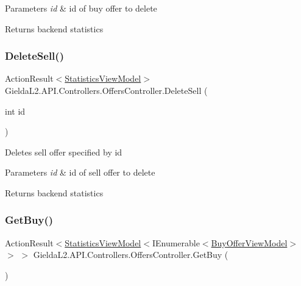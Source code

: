 \begin{DoxyParams}{Parameters}
{\em id} & id of buy offer to delete\\
\hline
\end{DoxyParams}
\begin{DoxyReturn}{Returns}
backend statistics
\end{DoxyReturn}
\mbox{\label{class_gielda_l2_1_1_a_p_i_1_1_controllers_1_1_offers_controller_a8290b7e739c2756489ff7d00b160fb82}} 
\subsubsection{\texorpdfstring{DeleteSell()}{DeleteSell()}}
{\footnotesize\ttfamily Action\+Result$<$\mbox{\hyperlink{class_gielda_l2_1_1_a_p_i_1_1_view_models_1_1_view_1_1_statistics_view_model}{Statistics\+View\+Model}}$>$ Gielda\+L2.\+A\+P\+I.\+Controllers.\+Offers\+Controller.\+Delete\+Sell (\begin{DoxyParamCaption}\item[{int}]{id }\end{DoxyParamCaption})}



Deletes sell offer specified by id 


\begin{DoxyParams}{Parameters}
{\em id} & id of sell offer to delete\\
\hline
\end{DoxyParams}
\begin{DoxyReturn}{Returns}
backend statistics
\end{DoxyReturn}
\mbox{\label{class_gielda_l2_1_1_a_p_i_1_1_controllers_1_1_offers_controller_a0c19e9a3ee9a48231d20f52d57048c22}} 
\subsubsection{\texorpdfstring{GetBuy()}{GetBuy()}\hspace{0.1cm}{\footnotesize\ttfamily [1/2]}}
{\footnotesize\ttfamily Action\+Result$<$\mbox{\hyperlink{class_gielda_l2_1_1_a_p_i_1_1_view_models_1_1_view_1_1_statistics_view_model}{Statistics\+View\+Model}}$<$I\+Enumerable$<$\mbox{\hyperlink{class_gielda_l2_1_1_a_p_i_1_1_view_models_1_1_view_1_1_buy_offer_view_model}{Buy\+Offer\+View\+Model}}$>$ $>$ $>$ Gielda\+L2.\+A\+P\+I.\+Controllers.\+Offers\+Controller.\+Get\+Buy (\begin{DoxyParamCaption}{ }\end{DoxyParamCaption})}



